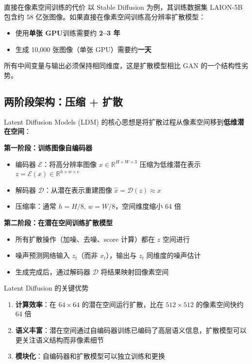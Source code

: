 \documentclass[a4paper]{article}
\begin{document}
\begin{warningbox}{直接在像素空间训练的代价}
以 Stable Diffusion 为例，其训练数据集 LAION-5B 包含约 58 亿张图像。如果直接在像素空间训练高分辨率扩散模型：
\begin{itemize}
    \item 使用\textbf{单张 GPU}训练需要约 \textbf{2--3 年}
    \item 生成 10,000 张图像（单张 GPU）需要约\textbf{一天}
\end{itemize}
所有中间变量与输出必须保持相同维度，这是扩散模型相比 GAN 的一个结构性劣势。
\end{warningbox}

\subsection{两阶段架构：压缩 + 扩散}

Latent Diffusion Models (LDM) 的核心思想是将扩散过程从像素空间移到\textbf{低维潜在空间}：

\textbf{第一阶段：训练图像自编码器}
\begin{itemize}
    \item 编码器 $\mathcal{E}$：将高分辨率图像 $x \in \mathbb{R}^{H\times W\times 3}$ 压缩为低维潜在表示 $z = \mathcal{E}(x) \in \mathbb{R}^{h\times w\times c}$
    \item 解码器 $\mathcal{D}$：从潜在表示重建图像 $\hat{x} = \mathcal{D}(z) \approx x$
    \item 压缩率：通常 $h = H/8$, $w = W/8$，空间维度缩小 64 倍
\end{itemize}

\textbf{第二阶段：在潜在空间训练扩散模型}
\begin{itemize}
    \item 所有扩散操作（加噪、去噪、score 计算）都在 $z$ 空间进行
    \item 噪声预测网络输入 $z_t$（而非 $x_t$），输出与 $z_t$ 同维度的噪声估计
    \item 生成完成后，通过解码器 $\mathcal{D}$ 将结果映射回像素空间
\end{itemize}

\begin{importantbox}{Latent Diffusion 的关键优势}
\begin{enumerate}
    \item \textbf{计算效率}：在 $64\times64$ 的潜在空间运行扩散，比在 $512\times512$ 的像素空间快约 64 倍
    \item \textbf{语义丰富}：潜在空间通过自编码器训练已编码了高层语义信息，扩散模型可以更关注语义结构而非像素细节
    \item \textbf{模块化}：自编码器和扩散模型可以独立训练和更换
\end{enumerate}
\end{importantbox}
\end{document}
